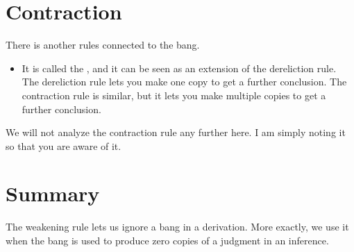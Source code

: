 \documentclass[../../../main.tex]{subfiles}
\begin{document}
\section{Contraction}

There is another rules connected to the bang. 

\begin{itemize}

\item{It is called the , and it can be seen as an extension of the dereliction rule. The dereliction rule lets you make one copy to get a further conclusion. The contraction rule is similar, but it lets you make multiple copies to get a further conclusion.}

\end{itemize}

\noindent
We will not analyze the contraction rule any further here. I am simply noting it so that you are aware of it.


\section{Summary}

The weakening rule lets us ignore a bang in a derivation. More exactly, we use it when the bang is used to produce zero copies of a judgment in an inference.
\end{document}

